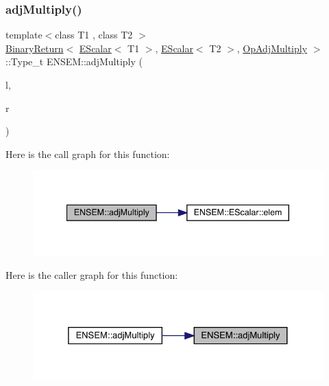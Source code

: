 \subsubsection{\texorpdfstring{adjMultiply()}{adjMultiply()}}
{\footnotesize\ttfamily template$<$class T1 , class T2 $>$ \\
\mbox{\hyperlink{structENSEM_1_1BinaryReturn}{Binary\+Return}}$<$ \mbox{\hyperlink{classENSEM_1_1EScalar}{E\+Scalar}}$<$ T1 $>$, \mbox{\hyperlink{classENSEM_1_1EScalar}{E\+Scalar}}$<$ T2 $>$, \mbox{\hyperlink{structENSEM_1_1OpAdjMultiply}{Op\+Adj\+Multiply}} $>$\+::Type\+\_\+t E\+N\+S\+E\+M\+::adj\+Multiply (\begin{DoxyParamCaption}\item[{const \mbox{\hyperlink{classENSEM_1_1EScalar}{E\+Scalar}}$<$ T1 $>$ \&}]{l,  }\item[{const \mbox{\hyperlink{classENSEM_1_1EScalar}{E\+Scalar}}$<$ T2 $>$ \&}]{r }\end{DoxyParamCaption})\hspace{0.3cm}{\ttfamily [inline]}}

Here is the call graph for this function\+:
\nopagebreak
\begin{figure}[H]
\begin{center}
\leavevmode
\includegraphics[width=340pt]{d4/dca/group__escalar_ga8cef36c4e2779c7d7dbf64b9500b053c_cgraph}
\end{center}
\end{figure}
Here is the caller graph for this function\+:
\nopagebreak
\begin{figure}[H]
\begin{center}
\leavevmode
\includegraphics[width=325pt]{d4/dca/group__escalar_ga8cef36c4e2779c7d7dbf64b9500b053c_icgraph}
\end{center}
\end{figure}
\mbox{\label{group__escalar_gab3c0c146aa415c32cb9ce5a6ad426d10}} 
